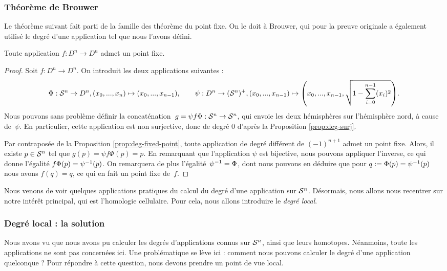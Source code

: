 \subsubsection{Théorème de Brouwer}

Le théorème suivant fait parti de la famille des théorème du point fixe. On le doit à Brouwer, qui pour la preuve originale a également utilisé le degré d'une application tel que nous l'avons défini.

\begin{theorem}
Toute application $f:D^n\to D^n$ admet un point fixe.
\end{theorem}
\begin{proof}
Soit $f:D^n\to D^n$. On introduit les deux applications suivantes : \[\Phi:\mathcal{S}^{n}\to D^n,(x_0,...,x_n)\mapsto(x_0,...,x_{n-1}),\qquad {\psi:D^n\to(\mathcal{S}^{n})^+,(x_0,...,x_{n-1})\mapsto \left(x_0,...,x_{n-1},\sqrt{1-\sum_{i=0}^{n-1}(x_i)^2}\right)}.\]Nous pouvons sans problème définir la concaténation~${g=\psi f\Phi:\mathcal{S}^{n}\to \mathcal{S}^{n}}$, qui envoie les deux hémisphères sur l'hémisphère nord, à cause de~$\psi$. En particulier, cette application est non surjective, donc de degré 0 d'après la Proposition \ref{prop:deg-surj}. 

Par contraposée de la Proposition \ref{prop:deg-fixed-point}, toute application de degré différent de $(-1)^{n+1}$ admet un point fixe. Alors, il existe $p\in \mathcal{S}^{n}$ tel que $g(p)=\psi f\Phi(p)=p$. En remarquant que l'application $\psi$ est bijective, nous pouvons appliquer l'inverse, ce qui donne l'égalité $f\Phi(p)=\psi^{-1}(p)$. On remarquera de plus l'égalité~$\psi^{-1}=\Phi$, dont nous pouvons en déduire que pour $q:=\Phi(p)=\psi^{-1}(p)$ nous avons $f(q)=q$, ce qui en fait un point fixe de~$f$.
\end{proof}

Nous venons de voir quelques applications pratiques du calcul du degré d'une application sur $\mathcal{S}^{n}$. Désormais, nous allons nous recentrer sur notre intérêt principal, qui est l'homologie cellulaire. Pour cela, nous allons introduire le \emph{degré local}.

\subsubsection{Degré local : la solution}


Nous avons vu que nous avons pu calculer les degrés d'applications connus sur $\mathcal{S}^{n}$, ainsi que leurs homotopes. Néanmoins, toute les applications ne sont pas concernées ici. Une problématique se lève ici : comment nous pouvons calculer le degré d'une application quelconque ? Pour répondre à cette question, nous devons prendre un point de vue local.

